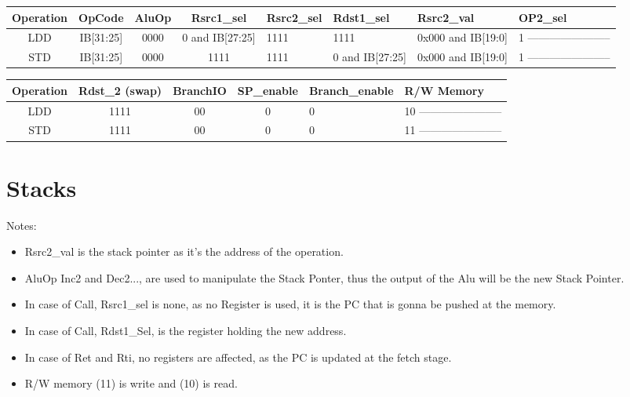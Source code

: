 \documentclass[12pt]{report}
\begin{document}
    \begin{center}
    \begin{tabular}{||c| c| c| c| p{40mm}||} 
    \hline
    Operation & OpCode & AluOp & Rsrc1_sel & Rsrc2_sel & Rdst1_sel & Rsrc2_val & OP2_sel  \\ [0.5ex] 
    \hline\hline
    LDD & IB[31:25] & 0000 & 0 and IB[27:25] & 1111 & 1111 & 0x000 and IB[19:0] & 1 ----------------------- \\
    \hline
    STD & IB[31:25] & 0000 & 1111 & 1111 & 0 and IB[27:25] & 0x000 and IB[19:0] & 1 ----------------------- \\
    \hline

    \end{tabular}
    \end{center}

    \begin{center}
    \begin{tabular}{||c| c| c| c| p{40mm}||} 
    \hline
    Operation & Rdst_2 (swap) & BranchIO & SP_enable & Branch_enable & R/W Memory  \\ [0.5ex] 
    \hline\hline
    LDD & 1111 & 00 & 0 & 0 & 10 ----------------------- \\
    \hline
    STD & 1111 & 00 & 0 & 0 & 11 ----------------------- \\
    \hline

    \end{tabular}
    \end{center}

    \section{Stacks}
    \item Notes:
    \begin{itemize}
        \item Rsrc2_val is the stack pointer as it's the address of the operation.
        \item AluOp Inc2 and Dec2..., are used to manipulate the Stack Ponter, thus the output of the Alu will be the new Stack Pointer.
        \item In case of Call, Rsrc1_sel is none, as no Register is used, it is the PC that is gonna be pushed at the memory.
        \item In case of Call, Rdst1_Sel, is the register holding the new address.
        \item In case of Ret and Rti, no registers are affected, as the PC is updated at the fetch stage.
        \item R/W memory (11) is write and (10) is read.
    \end{itemize}
\end{document}
